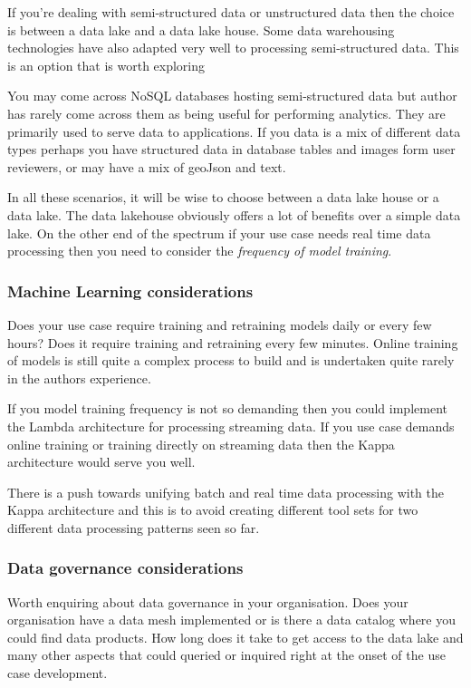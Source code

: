 \documentclass[a4paper, 11pt]{book}
\begin{document}
    If you're dealing with semi-structured data or unstructured data then the choice is between a data lake and a data lake house.
    Some data warehousing technologies have also adapted very well to processing semi-structured data.
    This is an option that is worth exploring

    You may come across NoSQL databases hosting semi-structured data but author has rarely come across them as being useful for performing analytics.
    They are primarily used to serve data to applications.
    If you data is a mix of different data types perhaps you have structured data in database tables and images form user reviewers, or may have a mix of geoJson and text.

    In all these scenarios, it will be wise to choose between a data lake house or a data lake.
    The data lakehouse obviously offers a lot of benefits over a simple data lake.
    On the other end of the spectrum if your use case needs real time data processing then you need to consider the \textit{frequency of model training}.

    \subsubsection{Machine Learning considerations}
    Does your use case require training and retraining models daily or every few hours?
    Does it require training and retraining every few minutes.
    Online training of models is still quite a complex process to build and is undertaken quite rarely in the authors experience.

    If you model training frequency is not so demanding then you could implement the Lambda architecture for processing streaming data.
    If you use case demands online training or training directly on streaming data then the Kappa architecture would serve you well.

    There is a push towards unifying batch and real time data processing with the Kappa architecture and this is to avoid creating different tool sets for two different data processing patterns seen so far.

    \subsubsection{Data governance considerations}
    Worth enquiring about data governance in your organisation.
    Does your organisation have a data mesh implemented or is there a data catalog where you could find data products.
    How long does it take to get access to the data lake and many other aspects that could queried or inquired right at the onset of the use case development.
\end{document}
